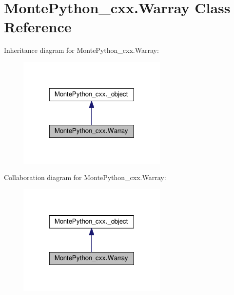 \hypertarget{classMontePython__cxx_1_1Warray}{}\section{Monte\+Python\+\_\+cxx.\+Warray Class Reference}
\label{classMontePython__cxx_1_1Warray}


Inheritance diagram for Monte\+Python\+\_\+cxx.\+Warray\+:
\nopagebreak
\begin{figure}[H]
\begin{center}
\leavevmode
\includegraphics[width=210pt]{classMontePython__cxx_1_1Warray__inherit__graph}
\end{center}
\end{figure}


Collaboration diagram for Monte\+Python\+\_\+cxx.\+Warray\+:
\nopagebreak
\begin{figure}[H]
\begin{center}
\leavevmode
\includegraphics[width=210pt]{classMontePython__cxx_1_1Warray__coll__graph}
\end{center}
\end{figure}
